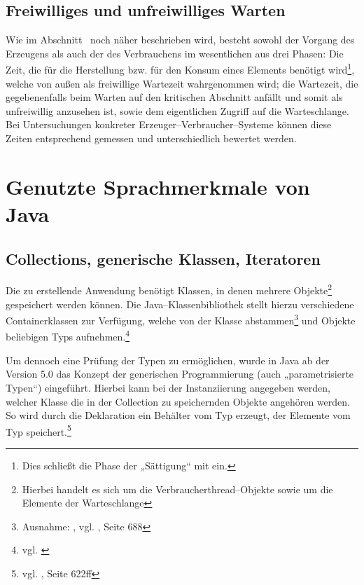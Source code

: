 \subsection{Freiwilliges und unfreiwilliges Warten} %
\label{sub:freiwilliges_und_unfreiwilliges_warten}

Wie im Abschnitt~ noch näher beschrieben wird, besteht sowohl der Vorgang des Erzeugens als auch der des Verbrauchens im wesentlichen aus drei Phasen: Die Zeit, die für die Herstellung bzw. für den Konsum eines Elements benötigt wird\footnote{Dies schließt die Phase der „Sättigung“ mit ein.}, welche von außen als freiwillige Wartezeit wahrgenommen wird; die Wartezeit, die gegebenenfalls beim Warten auf den kritischen Abschnitt anfällt und somit als unfreiwillig anzusehen ist, sowie dem eigentlichen Zugriff auf die Warteschlange. Bei Untersuchungen konkreter Erzeuger–Verbraucher–Systeme können diese Zeiten entsprechend gemessen und unterschiedlich bewertet werden.



\section{Genutzte Sprachmerkmale von Java} %
\label{sec:genutzte_sprachmerkmale_von_java}

\subsection{Collections, generische Klassen, Iteratoren} %
\label{sub:generics}
Die zu erstellende Anwendung benötigt Klassen, in denen mehrere Objekte\footnote{Hierbei handelt es sich um die Verbraucherthread–Objekte sowie um die Elemente der Warteschlange} gespeichert werden können. Die Java–Klassenbibliothek stellt hierzu verschiedene Containerklassen zur Verfügung, welche von der Klasse  abstammen\footnote{Ausnahme: , vgl. \cite{javaorange}, Seite 688} und Objekte beliebigen Typs aufnehmen.\footnote{vgl. \cite{javadoc:collection}}

Um dennoch eine Prüfung der Typen zu ermöglichen, wurde in Java ab der Version 5.0 das Konzept der generischen Programmierung (auch „parametrisierte Typen“) eingeführt. Hierbei kann bei der Instanziierung angegeben werden, welcher Klasse die in der Collection zu speichernden Objekte angehören werden. So wird durch die Deklaration  ein Behälter vom Typ  erzeugt, der Elemente vom Typ  speichert.\footnote{vgl. \cite{javaorange}, Seite 622ff}

